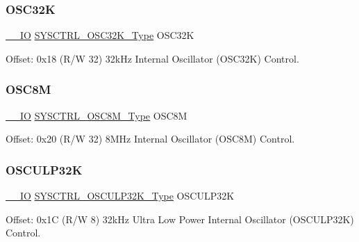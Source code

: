 \mbox{\label{struct_sysctrl_a4f03dd3c1354f85981f73e0210510533}} 
\subsubsection{\texorpdfstring{OSC32K}{OSC32K}}
{\footnotesize\ttfamily \mbox{\hyperlink{core__cm0plus_8h_aec43007d9998a0a0e01faede4133d6be}{\+\_\+\+\_\+\+IO}} \mbox{\hyperlink{union_s_y_s_c_t_r_l___o_s_c32_k___type}{S\+Y\+S\+C\+T\+R\+L\+\_\+\+O\+S\+C32\+K\+\_\+\+Type}} O\+S\+C32K}



Offset\+: 0x18 (R/W 32) 32k\+Hz Internal Oscillator (O\+S\+C32K) Control. 

\mbox{\label{struct_sysctrl_aa2d62a994e2590b1a6df6dfacf67cc7a}} 
\subsubsection{\texorpdfstring{OSC8M}{OSC8M}}
{\footnotesize\ttfamily \mbox{\hyperlink{core__cm0plus_8h_aec43007d9998a0a0e01faede4133d6be}{\+\_\+\+\_\+\+IO}} \mbox{\hyperlink{union_s_y_s_c_t_r_l___o_s_c8_m___type}{S\+Y\+S\+C\+T\+R\+L\+\_\+\+O\+S\+C8\+M\+\_\+\+Type}} O\+S\+C8M}



Offset\+: 0x20 (R/W 32) 8M\+Hz Internal Oscillator (O\+S\+C8M) Control. 

\mbox{\label{struct_sysctrl_adf5df9c96b0edb3eedc367c22440ed3b}} 
\subsubsection{\texorpdfstring{OSCULP32K}{OSCULP32K}}
{\footnotesize\ttfamily \mbox{\hyperlink{core__cm0plus_8h_aec43007d9998a0a0e01faede4133d6be}{\+\_\+\+\_\+\+IO}} \mbox{\hyperlink{union_s_y_s_c_t_r_l___o_s_c_u_l_p32_k___type}{S\+Y\+S\+C\+T\+R\+L\+\_\+\+O\+S\+C\+U\+L\+P32\+K\+\_\+\+Type}} O\+S\+C\+U\+L\+P32K}



Offset\+: 0x1C (R/W 8) 32k\+Hz Ultra Low Power Internal Oscillator (O\+S\+C\+U\+L\+P32K) Control. 

